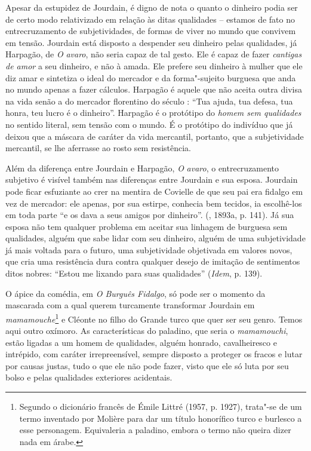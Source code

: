 Apesar da estupidez de Jourdain, é digno de nota o quanto o dinheiro
podia ser de certo modo relativizado em relação às ditas qualidades --
estamos de fato no entrecruzamento de subjetividades, de formas de viver
no mundo que convivem em tensão. Jourdain está disposto a despender seu
dinheiro pelas qualidades, já Harpagão, de \emph{O} \emph{avaro}, não
seria capaz de tal gesto. Ele é capaz de fazer \emph{cantigas de amor} a
seu dinheiro, e não à amada. Ele prefere seu dinheiro à mulher que ele
diz amar e sintetiza o ideal do mercador e da forma"-sujeito burguesa que
anda no mundo apenas a fazer cálculos. Harpagão é aquele que não aceita
outra divisa na vida senão a do mercador florentino do século : ``Tua
ajuda, tua defesa, tua honra, teu lucro é o dinheiro''. Harpagão é o
protótipo do \emph{homem sem qualidades} no sentido literal, sem tensão
com o mundo. É o protótipo do indivíduo que já deixou que a máscara de
caráter da vida mercantil, portanto, que a subjetividade mercantil, se
lhe aferrasse ao rosto sem resistência.

Além da diferença entre Jourdain e Harpagão, \emph{O} \emph{avaro}, o
entrecruzamento subjetivo é visível também nas diferenças entre Jourdain
e sua esposa. Jourdain pode ficar esfuziante ao crer na mentira de
Covielle de que seu pai era fidalgo em vez de mercador: ele apenas, por
sua estirpe, conhecia bem tecidos, ia escolhê-los em toda parte ``e os
dava a seus amigos por dinheiro''. (, 1893a, p. 141). Já sua
esposa não tem qualquer problema em aceitar sua linhagem de burguesa sem
qualidades, alguém que sabe lidar com seu dinheiro, alguém de uma
subjetividade já mais voltada para o futuro, uma subjetividade
objetivada em valores novos, que cria uma resistência dura contra
qualquer desejo de imitação de sentimentos ditos nobres: ``Estou me
lixando para suas qualidades'' (\emph{Idem}, p. 139).

O ápice da comédia, em \emph{O Burguês Fidalgo}, só pode ser o momento
da mascarada com a qual querem turcamente transformar Jourdain em
\emph{mamamouche}\footnote{Segundo o dicionário francês de Émile Littré
  (1957, p. 1927), trata"-se de um termo inventado por Molière para dar
  um título honorífico turco e burlesco a esse personagem. Equivaleria a
  paladino, embora o termo não queira dizer nada em árabe.} e Cléonte no
filho do Grande turco que quer ser seu genro. Temos aqui outro oxímoro.
As características do paladino, que seria o \emph{mamamouchi}, estão
ligadas a um homem de qualidades, alguém honrado, cavalheiresco e
intrépido, com caráter irrepreensível, sempre disposto a proteger os
fracos e lutar por causas justas, tudo o que ele não pode fazer, visto
que ele só luta por seu bolso e pelas qualidades exteriores acidentais.

